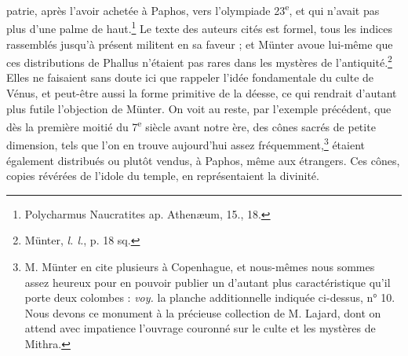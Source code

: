 \documentclass[a4paper, 11pt, oneside, polutonikogreek, french]{article}
\begin{document}
patrie, après l'avoir achetée à Paphos, vers l'olympiade 23\textsuperscript{e}, et qui n'avait pas plus d'une palme de haut.\footnote{Polycharmus Naucratites ap. Athenæum, 15., 18.} Le texte des auteurs cités est formel, tous les indices rassemblés jusqu'à présent militent en sa faveur ; et Münter avoue lui-même que ces distributions de Phallus n'étaient pas rares dans les mystères de l'antiquité.\footnote{Münter, \emph{l. l.}, p. 18 sq.} Elles ne faisaient sans doute ici que rappeler l'idée fondamentale du culte de Vénus, et peut-être aussi la forme primitive de la déesse, ce qui rendrait d'autant plus futile l'objection de Münter. On voit au reste, par l'exemple précédent, que dès la première moitié du 7\textsuperscript{e} siècle avant notre ère, des cônes sacrés de petite dimension, tels que l'on en trouve aujourd'hui assez fréquemment,\footnote{M. Münter en cite plusieurs à Copenhague, et nous-mêmes nous sommes assez heureux pour en pouvoir publier un d'autant plus caractéristique qu'il porte deux colombes : \emph{voy.} la planche additionnelle indiquée ci-dessus, n° 10. Nous devons ce monument à la précieuse collection de M. Lajard, dont on attend avec impatience l'ouvrage couronné sur le culte et les mystères de Mithra.} étaient également distribués ou plutôt vendus, à Paphos, même aux étrangers. Ces cônes, copies révérées de l'idole du temple, en représentaient la divinité.
\end{document}
